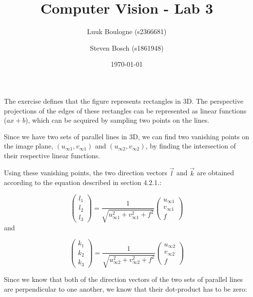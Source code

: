 \documentclass{article}
\title{Computer Vision - Lab 3}
\author{Luuk Boulogne (s2366681) \and Steven Bosch (s1861948)}
\date{\today}
\begin{document}
\maketitle

\section{}
The exercise defines that the figure represents rectangles in 3D.
The perspective projections of the edges of these rectangles can be represented as linear functions ($ax+b$), which can be acquired by sampling two points on the lines.

Since we have two sets of parallel lines in 3D, we can find two vanishing points on the image plane, $(u_{\infty 1},v_{\infty 1})$ and $(u_{\infty 2}, v_{\infty 2})$, by finding the intersection of their respective linear functions.

Using these vanishing points, the two direction vectors $\vec{l}$ and $\vec{k}$ are obtained according to the equation described in section 4.2.1.:

\begin{equation}
\left(
\begin{array}{c}
l_1 \\ l_2 \\ l_3
\end{array}
\right)
= \frac{1}{\sqrt{u_{\infty 1}^2+v_{\infty 1}^2+f^2}}
\left(
\begin{array}{c}
u_{\infty 1} \\ v_{\infty 1} \\ f
\end{array}
\right)
\end{equation}
and 

\begin{equation}
\left(
\begin{array}{c}
k_1 \\ k_2 \\ k_3
\end{array}
\right)
= \frac{1}{\sqrt{u_{\infty 2}^2+v_{\infty 2}^2+f^2}}
\left(
\begin{array}{c}
u_{\infty 2} \\ v_{\infty 2} \\ f
\end{array}
\right)
\end{equation}

Since we know that both of the direction vectors of the two sets of parallel lines are perpendicular to one another, we know that their dot-product has to be zero:
\end{document}
